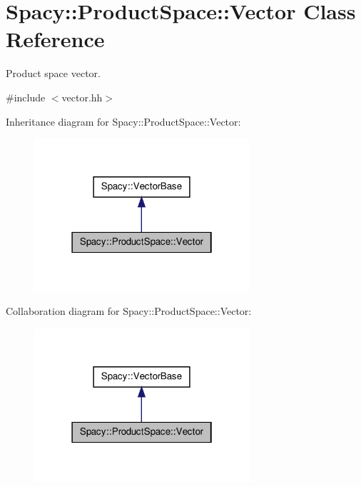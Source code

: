 \hypertarget{classSpacy_1_1ProductSpace_1_1Vector}{\section{\-Spacy\-:\-:\-Product\-Space\-:\-:\-Vector \-Class \-Reference}
\label{classSpacy_1_1ProductSpace_1_1Vector}
}


\-Product space vector.  




{\ttfamily \#include $<$vector.\-hh$>$}



\-Inheritance diagram for \-Spacy\-:\-:\-Product\-Space\-:\-:\-Vector\-:
\nopagebreak
\begin{figure}[H]
\begin{center}
\leavevmode
\includegraphics[width=226pt]{classSpacy_1_1ProductSpace_1_1Vector__inherit__graph}
\end{center}
\end{figure}


\-Collaboration diagram for \-Spacy\-:\-:\-Product\-Space\-:\-:\-Vector\-:
\nopagebreak
\begin{figure}[H]
\begin{center}
\leavevmode
\includegraphics[width=226pt]{classSpacy_1_1ProductSpace_1_1Vector__coll__graph}
\end{center}
\end{figure}
